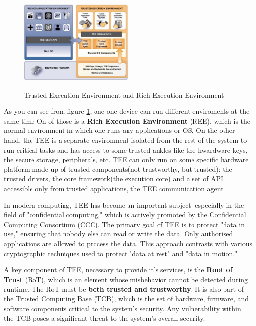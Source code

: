 \begin{figure}[H]
  \centering
  \includegraphics[width=0.5\textwidth]{img/Tee and REE.png}
  \label{fig:tee and ree}
  \caption{Trusted Execution Environment and Rich Execution
  Environment}
\end{figure}

As you can see from figure \ref{fig:tee and ree}, one one device can
run different enviroments at the same time On of those is a
\textbf{Rich Execution Environment} (REE), which is the normal
environment in which one runs any applications or OS. On the other
hand, the TEE is a separate environment isolated from the rest of the
system to run critical tasks and has access to some trusted ankles
like the hwardware keys, the secure storage, peripherals, etc.
TEE can only run on some specific hardware platform made up of trusted
components(not trustworthy, but trusted): the trusted drivers, the
core framework(the execution core) and a set of API accessible only
from trusted applications, the TEE communication agent 

In modern computing, TEE has become an important subject, especially
in the field of "confidential computing," which is actively promoted
by the Confidential Computing Consortium (CCC). The primary goal of
TEE is to protect "data in use," ensuring that nobody else can read or
write the data. Only authorized applications are allowed to process
the data. This approach contrasts with various cryptographic
techniques used to protect "data at rest" and "data in motion."

A key component of TEE, necessary to provide it's services, is the
\textbf{Root of Trust} (RoT), which is an element whose misbehavior
cannot be detected during runtime. The RoT must be \textbf{both
trusted and trustworthy}. It is also part of the Trusted Computing
Base (TCB), which is the set of hardware, firmware, and software
components critical to the system's security. Any vulnerability within
the TCB poses a significant threat to the system’s overall security.

